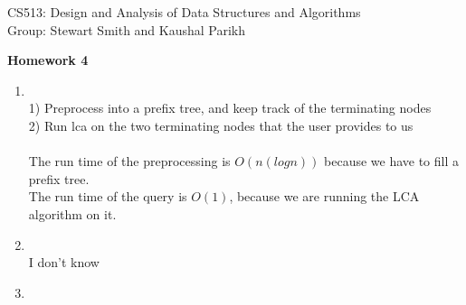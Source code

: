 \documentclass[11pt]{article}
\begin{document}

\noindent CS513: Design and Analysis of Data Structures and Algorithms \\
        Group: Stewart Smith and Kaushal Parikh\\

        \begin{center}
        \LARGE{\textbf{Homework 4}}\\
            \end{center}

            \vspace{.1in}


            \begin{enumerate}

            \item \\ 1) Preprocess into a prefix tree, and keep track of the terminating nodes\\
                     2) Run lca on the two terminating nodes that the user provides to us\\
                     \\ The run time of the preprocessing is $O(n(logn))$ because we have to fill a prefix tree.\\
                        The run time of the query is $O(1)$, because we are running the LCA algorithm on it.\\
            \item \\ I don't know\\
            \item \\
            \end{enumerate}

                                
\end{document}
